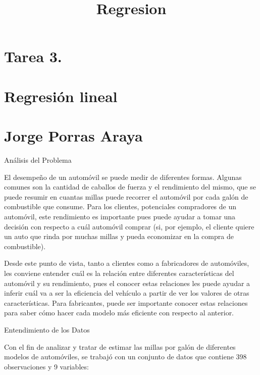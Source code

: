 \documentclass[]{article}
\title{Regresion}
\author{}
\date{}
\begin{document}
\maketitle

\hypertarget{tarea-3.}{%
\section{Tarea 3.}\label{tarea-3.}}

\hypertarget{regresion-lineal}{%
\section{Regresión lineal}\label{regresion-lineal}}

\hypertarget{jorge-porras-araya}{%
\section{Jorge Porras Araya}\label{jorge-porras-araya}}

Análisis del Problema

El desempeño de un automóvil se puede medir de diferentes formas.
Algunas comunes son la cantidad de caballos de fuerza y el rendimiento
del mismo, que se puede resumir en cuantas millas puede recorrer el
automóvil por cada galón de combustible que consume. Para los clientes,
potenciales compradores de un automóvil, este rendimiento es importante
pues puede ayudar a tomar una decisión con respecto a cuál automóvil
comprar (si, por ejemplo, el cliente quiere un auto que rinda por muchas
millas y pueda economizar en la compra de combustible).

Desde este punto de vista, tanto a clientes como a fabricadores de
automóviles, les conviene entender cuál es la relación entre diferentes
características del automóvil y su rendimiento, pues el conocer estas
relaciones les puede ayudar a inferir cuál va a ser la eficiencia del
vehículo a partir de ver los valores de otras características. Para
fabricantes, puede ser importante conocer estas relaciones para saber
cómo hacer cada modelo más eficiente con respecto al anterior.

Entendimiento de los Datos

Con el fin de analizar y tratar de estimar las millas por galón de
diferentes modelos de automóviles, se trabajó con un conjunto de datos
que contiene 398 observaciones y 9 variables:
\end{document}
